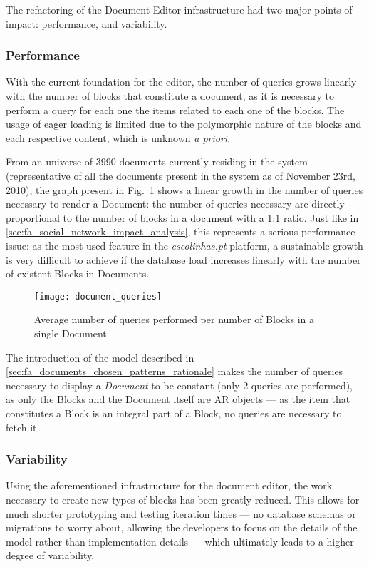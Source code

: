 The refactoring of the Document Editor infrastructure had two major points of impact: performance, and variability.


\subsubsection{Performance}

With the current foundation for the editor, the number of queries grows linearly with the number of blocks that constitute a document, as it is necessary to perform a query for each one the items related to each one of the blocks. The usage of eager loading is limited due to the polymorphic nature of the blocks and each respective content, which is unknown \emph{a priori}.

From an universe of 3990 documents currently residing in the system (representative of all the documents present in the system as of November 23rd, 2010), the graph present in Fig.~\ref{fig:queries_per_blocks_in_document} shows a linear growth in the number of queries necessary to render a Document: the number of queries necessary are directly proportional to the number of blocks in a document with a 1:1 ratio. Just like in \ref{sec:fa_social_network_impact_analysis}, this represents a serious performance issue: as the most used feature in the \emph{escolinhas.pt} platform, a sustainable growth is very difficult to achieve if the database load increases linearly with the number of existent Blocks in Documents.

\begin{figure}[H]
  \centering
  \texttt{[image: document\_queries]}
  \caption{Average number of queries performed per number of Blocks in a single Document}
  \label{fig:queries_per_blocks_in_document}
\end{figure}

The introduction of the model described in \ref{sec:fa_documents_chosen_patterns_rationale} makes the number of queries necessary to display a \emph{Document} to be constant (only 2 queries are performed), as only the Blocks and the Document itself are AR objects --- as the item that constitutes a Block is an integral part of a Block, no queries are necessary to fetch it.

\subsubsection{Variability}

Using the aforementioned infrastructure for the document editor, the work necessary to create new types of blocks has been greatly reduced. This allows for much shorter prototyping and testing iteration times --- no database schemas or migrations to worry about, allowing the developers to focus on the details of the model rather than implementation details --- which ultimately leads to a higher degree of variability.



